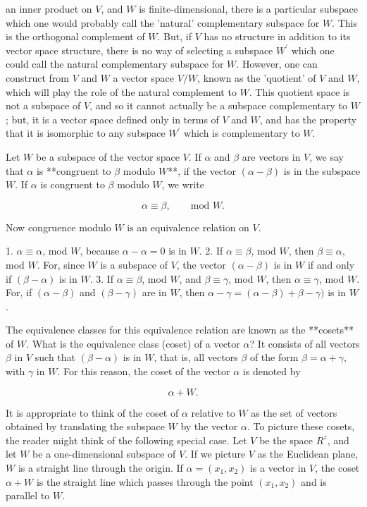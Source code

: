 an inner product on \(V\), and \(W\) is finite-dimensional, there is a particular subspace which one would probably call the 'natural' complementary subspace for \(W\). This is the orthogonal complement of \(W\). But, if \(V\) has no structure in addition to its vector space structure, there is no way of selecting a subspace \(W^{\prime}\) which one could call the natural complementary subspace for \(W\). However, one can construct from \(V\) and \(W\) a vector space \(V/W\), known as the 'quotient' of \(V\) and \(W\), which will play the role of the natural complement to \(W\). This quotient space is not a subspace of \(V\), and so it cannot actually be a subspace complementary to \(W\); but, it is a vector space defined only in terms of \(V\) and \(W\), and has the property that it is isomorphic to any subspace \(W^{\prime}\) which is complementary to \(W\).

Let \(W\) be a subspace of the vector space \(V\). If \(\alpha\) and \(\beta\) are vectors in \(V\), we say that \(\alpha\) is **congruent to \(\beta\) modulo \(W\)**, if the vector \((\alpha-\beta)\) is in the subspace \(W\). If \(\alpha\) is congruent to \(\beta\) modulo \(W\), we write

\[\alpha\equiv\beta,\qquad\mbox{mod }W.\]

Now congruence modulo \(W\) is an equivalence relation on \(V\).

1. \(\alpha\equiv\alpha\), mod \(W\), because \(\alpha-\alpha=0\) is in \(W\).
2. If \(\alpha\equiv\beta\), mod \(W\), then \(\beta\equiv\alpha\), mod \(W\). For, since \(W\) is a subspace of \(V\), the vector \((\alpha-\beta)\) is in \(W\) if and only if \((\beta-\alpha)\) is in \(W\).
3. If \(\alpha\equiv\beta\), mod \(W\), and \(\beta\equiv\gamma\), mod \(W\), then \(\alpha\equiv\gamma\), mod \(W\). For, if \((\alpha-\beta)\) and \((\beta-\gamma)\) are in \(W\), then \(\alpha-\gamma=(\alpha-\beta)+\beta-\gamma)\) is in \(W\).

The equivalence classes for this equivalence relation are known as the **cosets** of \(W\). What is the equivalence class (coset) of a vector \(\alpha\)? It consists of all vectors \(\beta\) in \(V\) such that \((\beta-\alpha)\) is in \(W\), that is, all vectors \(\beta\) of the form \(\beta=\alpha+\gamma\), with \(\gamma\) in \(W\). For this reason, the coset of the vector \(\alpha\) is denoted by

\[\alpha+W.\]

It is appropriate to think of the coset of \(\alpha\) relative to \(W\) as the set of vectors obtained by translating the subspace \(W\) by the vector \(\alpha\). To picture these cosets, the reader might think of the following special case. Let \(V\) be the space \(R^{z}\), and let \(W\) be a one-dimensional subspace of \(V\). If we picture \(V\) as the Euclidean plane, \(W\) is a straight line through the origin. If \(\alpha=(x_{1},x_{2})\) is a vector in \(V\), the coset \(\alpha+W\) is the straight line which passes through the point \((x_{1},x_{2})\) and is parallel to \(W\).


